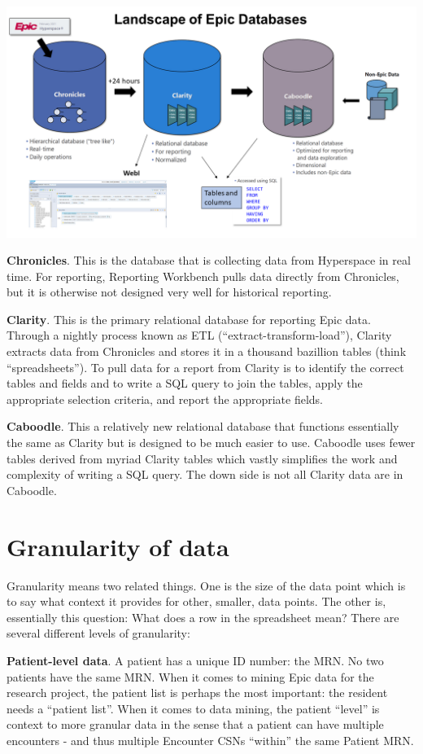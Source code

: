 \documentclass[
]{report}
\begin{document}
\includegraphics{EpicDataLandscape.png}

\textbf{Chronicles}. This is the database that is collecting data from
Hyperspace in real time. For reporting, Reporting Workbench pulls data
directly from Chronicles, but it is otherwise not designed very well for
historical reporting.

\textbf{Clarity}. This is the primary relational database for reporting
Epic data. Through a nightly process known as ETL
(``extract-transform-load''), Clarity extracts data from Chronicles and
stores it in a thousand bazillion tables (think ``spreadsheets''). To
pull data for a report from Clarity is to identify the correct tables
and fields and to write a SQL query to join the tables, apply the
appropriate selection criteria, and report the appropriate fields.

\textbf{Caboodle}. This a relatively new relational database that
functions essentially the same as Clarity but is designed to be much
easier to use. Caboodle uses fewer tables derived from myriad Clarity
tables which vastly simplifies the work and complexity of writing a SQL
query. The down side is not all Clarity data are in Caboodle.

\hypertarget{granularity-of-data}{%
\section{Granularity of data}\label{granularity-of-data}}

Granularity means two related things. One is the size of the data point
which is to say what context it provides for other, smaller, data
points. The other is, essentially this question: What does a row in the
spreadsheet mean? There are several different levels of granularity:

\textbf{Patient-level data}. A patient has a unique ID number: the MRN.
No two patients have the same MRN. When it comes to mining Epic data for
the research project, the patient list is perhaps the most important:
the resident needs a ``patient list''. When it comes to data mining, the
patient ``level'' is context to more granular data in the sense that a
patient can have multiple encounters - and thus multiple Encounter CSNs
``within'' the same Patient MRN.
\end{document}
